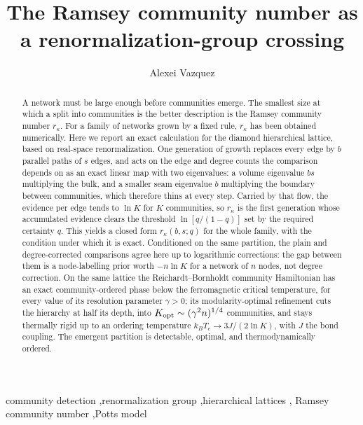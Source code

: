 \documentclass[preprint,12pt]{elsarticle}
\newcommand{\rk}{r_{\kappa}}
\begin{document}
\begin{frontmatter}

\title{The Ramsey community number as a renormalization-group crossing}

\author{Alexei Vazquez}

\begin{abstract}
A network must be large enough before communities emerge. The smallest size at
which a split into communities is the better description is the Ramsey community
number $\rk$. For a family of networks grown by a fixed
rule, $\rk$ has been obtained numerically. Here we report an exact calculation for the diamond hierarchical
lattice, based on real-space renormalization. One generation of growth replaces every edge by $b$ parallel paths of
$s$ edges, and acts on the edge and degree counts the comparison depends on
as an exact
linear map with two eigenvalues: a volume eigenvalue $bs$ multiplying the bulk,
and a smaller seam eigenvalue $b$ multiplying the boundary between communities,
which therefore thins at every step. Carried by that flow, the evidence per edge
tends to $\ln K$ for $K$ communities, so $\rk$ is the first generation whose
accumulated evidence clears the threshold $\ln[q/(1-q)]$ set by the required
certainty $q$. This yields a closed form $\rk(b,s;q)$ for the whole family, with
the condition under which it is exact. Conditioned on the same partition, the
plain and degree-corrected comparisons agree here up to logarithmic corrections:
the gap between them is a node-labelling prior worth $-n\ln K$ for a network of
$n$ nodes, not degree correction. On the same lattice the Reichardt--Bornholdt
community Hamiltonian has an exact community-ordered phase below the
ferromagnetic critical temperature, for every value of its resolution parameter
$\gamma>0$; its modularity-optimal refinement cuts the hierarchy at half its
depth, into $K_{\rm opt}\sim(\gamma^2n)^{1/4}$ communities, and stays thermally
rigid up to an ordering temperature $k_BT_c\to3J/(2\ln K)$, with $J$ the bond
coupling. The emergent partition is detectable, optimal, and thermodynamically
ordered.
\end{abstract}

\begin{keyword}
community detection \sep renormalization group \sep hierarchical lattices \sep
Ramsey community number \sep Potts model
\end{keyword}

\end{frontmatter}
\end{document}
